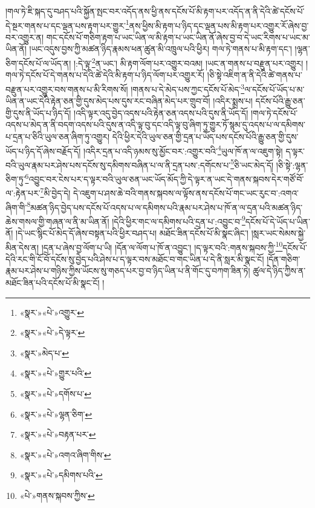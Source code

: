 །གལ་ཏེ་ཇི་སྐད་དུ་བཤད་པའི་སྐྱོན་སྤང་བར་འདོད་ནས་ཕྱི་ནས་དངོས་པོ་མི་རྟག་པར་འདོད་ན་ནི་དེའི་ཚེ་དངོས་པོ་དེ་སྔར་གནས་པ་དང་ལྡན་པས་རྟག་པར་གྱུར་\footnote{«སྣར་»«པེ་»འགྱུར་}ནས་ཕྱིས་མི་རྟག་པ་ཉིད་དང་ལྡན་པས་མི་རྟག་པར་འགྱུར་རོ་ཞེས་བྱ་བར་འགྱུར་ན། གང་དངོས་པོ་གཅིག་རྟག་པ་ཡང་ཡིན་ལ་མི་རྟག་པ་ཡང་ཡིན་ནོ་ཞེས་བྱ་བ་དེ་ཡང་རིགས་པ་ཡང་མ་ཡིན་ནོ། །ཡང་འདུས་བྱས་ཀྱི་མཚན་ཉིད་རྣམས་ཕན་ཚུན་མི་འཁྲུལ་པའི་ཕྱིར། གལ་ཏེ་གནས་པ་མི་རྟག་དང་། །ལྷན་ཅིག་དངོས་པོ་ལ་ཡོད་ན། །:དེ་ལྟ་\footnote{«སྣར་»«པེ་»དེ་ལྟར་}ན་ཡང་། མི་རྟག་ལོག་པར་འགྱུར་བའམ། །ཡང་ན་གནས་པ་བརྫུན་པར་འགྱུར། །གལ་ཏེ་དངོས་པོ་དེ་གནས་པ་དེའི་ཚེ་དེའི་མི་རྟག་པ་ཉིད་ལོག་པར་འགྱུར་རོ། །ཅི་སྟེ་འཇིག་ན་ནི་དེའི་ཚེ་གནས་པ་བརྫུན་པར་འགྱུར་བས་གནས་པ་མི་རིགས་སོ། །གནས་པ་དེ་མེད་པས་ཀྱང་དངོས་པོ་མེད་\footnote{«སྣར་»མེད་པ་}ལ་དངོས་པོ་ཡོད་པ་མ་ཡིན་ན་ཡང་དེའི་རྟེན་ཅན་གྱི་དུས་མེད་པས་དུས་རང་བཞིན་མེད་པར་གྲུབ་བོ། །འདིར་སྨྲས་པ། དངོས་པོའི་རྒྱུ་ཅན་གྱི་དུས་ནི་ཡོད་པ་ཉིད་དོ། །འདི་ལྟར་འདུ་བྱེད་འདས་པའི་རྟེན་ཅན་འདས་པའི་དུས་ནི་ཡོད་དོ། །གལ་ཏེ་དངོས་པོ་འདས་པ་མེད་ན་ནི་བདག་འདས་པའི་དུས་ན་འདི་ལྟ་བུ་དང་འདི་ལྟ་བུ་ཞིག་ཏུ་གྱུར་ཏོ་སྙམ་དུ་འདས་པ་ལ་དམིགས་པ་དྲན་པ་ཅིའི་ཡུལ་ཅན་ཞིག་ཏུ་འགྱུར། དེའི་ཕྱིར་དེའི་ཡུལ་ཅན་གྱི་དྲན་པ་ཡོད་པས་དངོས་པོའི་རྒྱུ་ཅན་གྱི་དུས་ཡོད་པ་ཉིད་དོ་ཞེས་བརྗོད་དོ། །འདིར་དྲན་པ་འདི་ཉམས་སུ་མྱོང་བར་:འགྱུར་བའི་\footnote{«སྣར་»«པེ་»གྱུར་པའི་}ཡུལ་ཁོ་ན་ལ་འཇུག་སྟེ། ད་ལྟར་བའི་ཡུལ་རྣམ་པར་ཤེས་པས་དངོས་སུ་དམིགས་བཞིན་པ་ལ་ནི་དྲན་པས་:དགོངས་པ་\footnote{«སྣར་»«པེ་»དགོས་པ་}ཅི་ཡང་མེད་དོ། །ཅི་སྟེ་:ལྷན་ཅིག་ཏུ་\footnote{«སྣར་»«པེ་»ལྷན་ཅིག་}འབྱུང་བར་ངེས་པར་ད་ལྟར་བའི་ཡུལ་ཅན་ཡང་ཡོད་མོད་ཀྱི་དེ་ལྟར་ན་ཡང་དེ་གནས་སྐབས་དེར་གཙོ་བོ་ལ་:རྟེན་པར་\footnote{«སྣར་»«པེ་»བརྟན་པར་}མི་བྱེད་དེ། དེ་འཇུག་པ་ཤས་ཆེ་བའི་གནས་སྐབས་ལ་ལྟོས་ནས་དངོས་པོ་གང་ཡང་རུང་བ་:འགའ་ཞིག་གི་\footnote{«སྣར་»«པེ་»འགའ་ཞིག་གིས་}མཚན་ཉིད་བྱེད་པས་དངོས་པོ་འདས་པ་ལ་དམིགས་པའི་རྣམ་པར་ཤེས་པ་ཁོ་ན་ལ་དྲན་པའི་མཚན་ཉིད་ཆེས་གསལ་གྱི་གཞན་ལ་ནི་མ་ཡིན་ནོ། །དེའི་ཕྱིར་གང་ལ་དམིགས་པའི་དྲན་པ་:འབྱུང་བ་\footnote{«སྣར་»«པེ་»དམིགས་པའི་}དངོས་པོ་དེ་ཡོད་པ་ཡིན་ནོ། །དེ་ཡང་སྙིང་པོ་མེད་དོ་ཞེས་བསྟན་པའི་ཕྱིར་བཤད་པ། མཐོང་ཟིན་དངོས་པོ་མི་སྣང་ཞིང་། །སླར་ཡང་སེམས་སྐྱེ་མིན་དེས་ན། །དྲན་པ་ཞེས་བྱ་ལོག་པ་ཡི། །དོན་ལ་ལོག་པ་ཁོ་ན་འབྱུང་། །ད་ལྟར་བའི་:གནས་སྐབས་ཀྱི་\footnote{«པེ་»གནས་སྐབས་ཀྱིས་}དངོས་པོ་དེའི་རང་གི་ངོ་བོ་དངོས་སུ་བྱེད་པའི་ཤེས་པ་ད་ལྟར་བས་མཐོང་བ་གང་ཡིན་པ་དེ་ནི་སླར་མི་སྣང་ངོ། །དོན་གཅིག་རྣམ་པར་ཤེས་པ་གཉིས་ཀྱིས་ཡོངས་སུ་གཅད་པར་བྱ་བ་ཉིད་ཡིན་པ་ནི་གོང་དུ་བཀག་ཟིན་ཏེ། ཚུལ་དེ་ཉིད་ཀྱིས་ན་མཐོང་ཟིན་པའི་དངོས་པོ་མི་སྣང་ངོ། །
